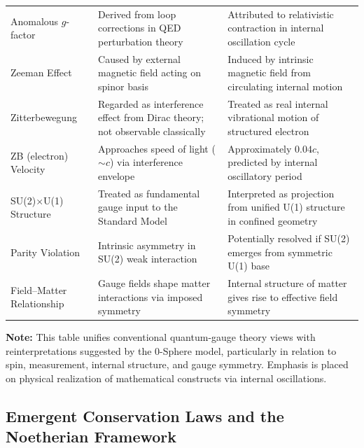 \documentclass[%
 reprint,
 amsmath,amssymb,
 aps,
]{revtex4-1}
\numberwithin{equation}{section}%
\begin{document}
\begin{table}[t!]
\begin{tabular}{p{4.8cm}p{6.2cm}p{6.2cm}}
\addlinespace[0.3cm]
Anomalous $g$-factor & Derived from loop corrections in QED perturbation theory & Attributed to relativistic contraction in internal oscillation cycle \\
\addlinespace[0.3cm]
Zeeman Effect & Caused by external magnetic field acting on spinor basis & Induced by intrinsic magnetic field from circulating internal motion \\
\addlinespace[0.3cm]
Zitterbewegung & Regarded as interference effect from Dirac theory; not observable classically & Treated as real internal vibrational motion of structured electron \\
\addlinespace[0.3cm]
ZB (electron) Velocity & Approaches speed of light ($\sim c$) via interference envelope & Approximately $0.04c$, predicted by internal oscillatory period \\
\addlinespace[0.3cm]
SU(2)$\times$U(1) Structure & Treated as fundamental gauge input to the Standard Model & Interpreted as projection from unified U(1) structure in confined geometry \\
\addlinespace[0.3cm]
Parity Violation & Intrinsic asymmetry in SU(2) weak interaction & Potentially resolved if SU(2) emerges from symmetric U(1) base \\
\addlinespace[0.3cm]
Field–Matter Relationship & Gauge fields shape matter interactions via imposed symmetry & Internal structure of matter gives rise to effective field symmetry \\
\bottomrule
\end{tabular}
\vspace{0.2cm}
\begin{flushleft}
\footnotesize
\textbf{Note:} This table unifies conventional quantum-gauge theory views with reinterpretations suggested by the 0-Sphere model, particularly in relation to spin, measurement, internal structure, and gauge symmetry. Emphasis is placed on physical realization of mathematical constructs via internal oscillations.
\end{flushleft}
\end{table}

\vfill  %
\clearpage  %



\subsection{Emergent Conservation Laws and the Noetherian Framework}
\end{document}
